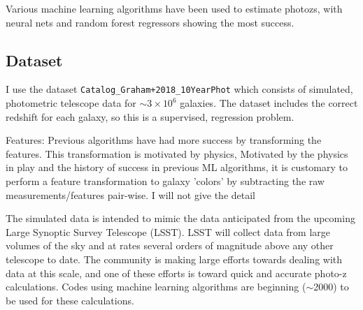 \documentclass[13pt]{amsart}
\begin{document}
  Various machine learning algorithms have been used to estimate photozs, with neural nets and random forest regressors showing the most success.


  \subsection{Dataset}

    I use the dataset \texttt{Catalog\_Graham+2018\_10YearPhot} which consists of simulated, photometric telescope data for $\sim3 \times 10^{6}$ galaxies. The dataset includes the correct redshift for each galaxy, so this is a supervised, regression problem.

    Features: Previous algorithms have had more success by transforming the features. This transformation is motivated by physics,   Motivated by the physics in play and the history of success in previous ML algorithms, it is customary to perform a feature transformation to galaxy 'colors' by subtracting the raw measurements/features pair-wise. I will not give the detail

    The simulated data is intended to mimic the data anticipated from the upcoming Large Synoptic Survey Telescope (LSST). LSST will collect data from large volumes of the sky and at rates several orders of magnitude above any other telescope to date. The community is making large efforts towards dealing with data at this scale, and one of these efforts is toward quick and accurate photo-z calculations. Codes using machine learning algorithms are beginning ($\sim$2000) to be used for these calculations.
\end{document}
